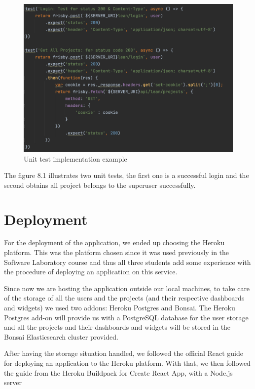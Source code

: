 \documentclass[a4paper,twoside,10pt]{report}
\begin{document}
\begin{figure}[h!]
\center
  \includegraphics[width=\textwidth]{tests.png}
\caption{Unit test implementation example}
\end{figure}

\newpage
The figure 8.1 illustrates two unit tests, the first one is a successful login and the second obtains all project belongs to the superuser successfully.

\section{Deployment}
For the deployment of the application, we ended up choosing the Heroku platform. This was the platform chosen since it was used previously in the Software Laboratory course and thus all three students add some experience with the procedure of deploying an application on this service.

Since now we are hosting the application outside our local machines, to take care of the storage of all the users and the projects (and their respective dashboards and widgets) we used two addons: Heroku Postgres\cite{HEROKUPOSTGRES} and Bonsai. The Heroku Postgres add-on will provide us with a PostgreSQL database for the user storage and all the projects and their dashboards and widgets will be stored in the Bonsai Elasticsearch cluster provided.

After having the storage situation handled, we followed the official React guide for deploying an application\cite{REACTDEPLOYMENT} to the Heroku platform. With that, we then followed the guide from the Heroku Buildpack for Create React App, with a Node.js server
\end{document}
